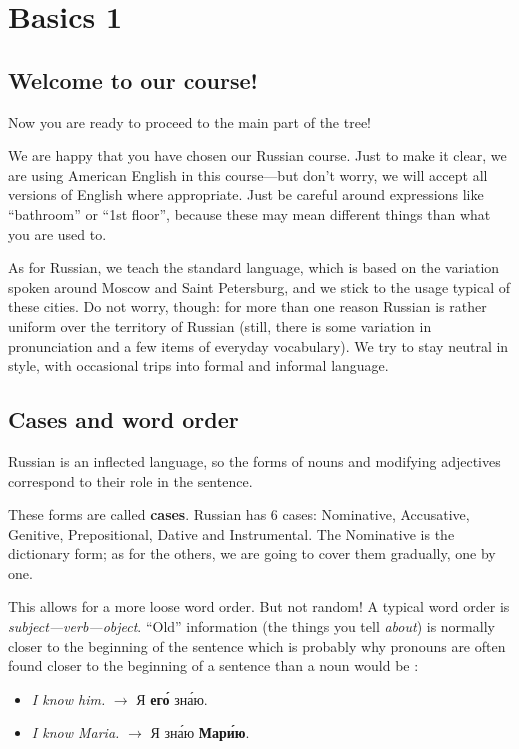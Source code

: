 \chapter{Basics 1}\label{basics-1}

\section{Welcome to our course!}\label{welcome-to-our-course}

Now you are ready to proceed to the main part of the tree!

We are happy that you have chosen our Russian course. Just to make it
clear, we are using American English in this course---but don't worry,
we will accept all versions of English where appropriate. Just be
careful around expressions like ``bathroom'' or ``1st floor'', because
these may mean different things than what you are used to.

As for Russian, we teach the standard language, which is based on the
variation spoken around Moscow and Saint Petersburg, and we stick to the
usage typical of these cities. Do not worry, though: for more than one
reason Russian is rather uniform over the territory of Russian (still,
there is some variation in pronunciation and a few items of everyday
vocabulary). We try to stay neutral in style, with occasional trips into
formal and informal language.

\section{Cases and word order}\label{cases-and-word-order}

Russian is an inflected language, so the forms of nouns and modifying
adjectives correspond to their role in the sentence.

These forms are called \textbf{cases}. Russian has 6 cases: Nominative,
Accusative, Genitive, Prepositional, Dative and Instrumental. The
Nominative is the dictionary form; as for the others, we are going to
cover them gradually, one by one.

This allows for a more loose word order. But not random! A typical word
order is \emph{subject---verb---object}. ``Old'' information (the things
you tell \emph{about}) is normally closer to the beginning of the
sentence which is probably why pronouns are often found closer to the
beginning of a sentence than a noun would be :

\begin{itemize}
\tightlist
\item
  \emph{I know him.} $ \rightarrow$ Я \textbf{ег\'{о}} зн\'{а}ю.
\item
  \emph{I know Maria.} $ \rightarrow$ Я зн\'{а}ю \textbf{Мар\'{и}ю}.
\end{itemize}

